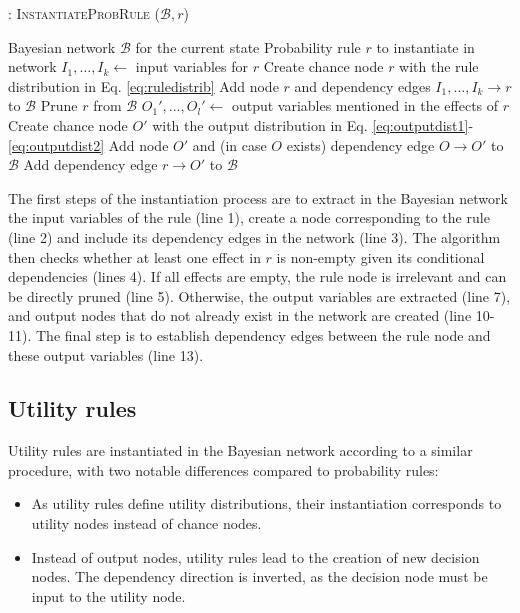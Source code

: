 \begin{algorithm}[h!]
\caption{: \textsc{InstantiateProbRule} ($\mathcal{B}, \mathit{r}$)}
\begin{algorithmic}[1] \vspace{1mm}
\REQUIRE Bayesian network $\mathcal{B}$ for the current state
\REQUIRE Probability rule $\mathit{r}$ to instantiate in network  \vspace{1mm}
\STATE $I_1, \dots, I_k \leftarrow$ input variables for $\mathit{r}$
\STATE Create chance node $r$ with the rule distribution in Eq. \eqref{eq:ruledistrib}
\STATE Add node $r$ and dependency edges $I_1, \dots, I_k \rightarrow r$ to $\mathcal{B}$ 
\STATE Prune $r$ from $\mathcal{B}$
\ELSE
\STATE $O_1', \dots, O_l' \leftarrow$ output variables mentioned in the effects of $r$
\STATE Create chance node $O'$ with the output distribution in Eq. \eqref{eq:outputdist1}-\eqref{eq:outputdist2}
\STATE Add node $O'$ and (in case $O$ exists) dependency edge $O \rightarrow O'$ to $\mathcal{B}$
\ENDIF
\STATE Add dependency edge $r \rightarrow O'$ to $\mathcal{B}$ 
\ENDFOR
\ENDIF
\end{algorithmic}
\label{algo:instantiateProbRule}
\end{algorithm}

The first steps of the instantiation process are to extract in the Bayesian network the input variables of the rule (line 1), create a node corresponding to the rule (line 2) and include its dependency edges in the network (line 3).  The algorithm then checks whether at least one effect in $r$ is non-empty given its conditional dependencies (lines 4).  If all effects are empty, the rule node is irrelevant and can be directly pruned (line 5). Otherwise, the output variables are extracted (line 7), and output nodes that do not already exist in the network are created (line 10-11). The final step is to establish dependency edges between the rule node and these output variables (line 13).


\subsection{Utility rules}

Utility rules are instantiated in the Bayesian network according to a similar procedure, with two notable differences compared to probability rules: \begin{itemize}
\item As utility rules define utility distributions, their instantiation corresponds to utility nodes instead of chance nodes.
\item Instead of output nodes, utility rules lead to the creation of new decision nodes. The dependency direction is inverted, as the decision node must be input to the utility node.
\end{itemize} 

